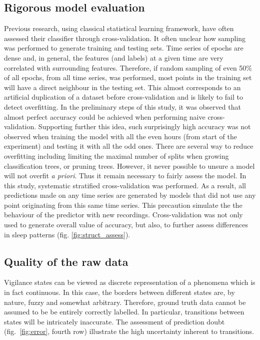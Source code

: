 \subsection{Rigorous model evaluation}

Previous research, using classical statistical learning framework,
have often assessed their classifier through cross-validation.
It often unclear how sampling was performed to generate training and testing sets.
Time series of epochs are dense and, in general,
the features (and labels) at a given time are very correlated with surrounding features.
Therefore, if random sampling of even 50\% of all epochs, from all time series, was performed,
most points in the training set will have a direct neighbour in the testing set.
This almost corresponds to an artificial duplication of a dataset before cross-validation and is likely to fail to detect overfitting.
In the preliminary steps of this study, it was observed that almost perfect accuracy could be achieved when performing naive cross-validation.
Supporting further this idea, such surprisingly high accuracy was not observed when training the model
with all the even hours (from start of the experiment) and testing it with all the odd ones.
There are several way to reduce overfitting including limiting the maximal number of splits when growing classification trees, or pruning trees.
However, it never possible to unsure a model will not overfit \emph{a priori}.
Thus it remain necessary to fairly assess the model.
In this study, systematic stratified cross-validation was performed.
As a result, all predictions made on any time series are generated by models
that did not use any point originating from this same time series. This precaution simulate the the behaviour of the predictor with new recordings.
Cross-validation was not only used to generate overall value of accuracy, but also, to further assess differences in sleep patterns (fig. \ref{fig:struct_assess}).

\subsection{Quality of the raw data}

Vigilance states can be viewed as discrete representation of a phenomena which is in fact continuous.
In this case, the borders between different states are, by nature, fuzzy and somewhat arbitrary.
Therefore, ground truth data cannot be assumed to be be entirely correctly labelled.
In particular, transitions between states will be intricately inaccurate.
The assessment of prediction doubt (fig.~\ref{fig:error}, fourth row) illustrate the high uncertainty inherent to transitions.

